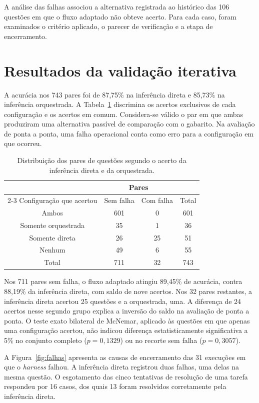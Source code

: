 \documentclass[a4paper,10pt, twocolumn]{article}
\begin{document}
A análise das falhas associou a alternativa registrada ao histórico das 106 questões em que o fluxo adaptado não obteve acerto. Para cada caso, foram examinados o critério aplicado, o parecer de verificação e a etapa de encerramento.

\clearpage
\section{Resultados da validação iterativa}

A acurácia nos 743 pares foi de 87,75\% na inferência direta e 85,73\% na inferência orquestrada. A Tabela~\ref{tab:pares} discrimina os acertos exclusivos de cada configuração e os acertos em comum. Considera-se válido o par em que ambas produziram uma alternativa passível de comparação com o gabarito. Na avaliação de ponta a ponta, uma falha operacional conta como erro para a configuração em que ocorreu.

\begin{table}[H]
\caption{Distribuição dos pares de questões segundo o acerto da inferência direta e da orquestrada.}\label{tab:pares}
\centering\small
\begin{tabular}{@{}cccc@{}}
\toprule
& \multicolumn{2}{c}{Pares} & \\
\cmidrule(lr){2-3}
Configuração que acertou & Sem falha & Com falha & Total \\
\midrule
Ambos & 601 & 0 & 601 \\
Somente orquestrada & 35 & 1 & 36 \\
Somente direta & 26 & 25 & 51 \\
Nenhum & 49 & 6 & 55 \\
\midrule
Total & 711 & 32 & 743 \\
\bottomrule
\end{tabular}
\end{table}

Nos 711 pares sem falha, o fluxo adaptado atingiu 89,45\% de acurácia, contra 88,19\% da inferência direta, com saldo de nove acertos. Nos 32 pares restantes, a inferência direta acertou 25 questões e a orquestrada, uma. A diferença de 24 acertos nesse segundo grupo explica a inversão do saldo na avaliação de ponta a ponta. O teste exato bilateral de McNemar, aplicado às questões em que apenas uma configuração acertou, não indicou diferença estatisticamente significativa a 5\% no conjunto completo ($p=0{,}1329$) ou no recorte sem falha ($p=0{,}3057$).

A Figura~\ref{fig:falhas} apresenta as causas de encerramento das 31 execuções em que o \textit{harness} falhou. A inferência direta registrou duas falhas, uma delas na mesma questão. O esgotamento das cinco tentativas de resolução de uma tarefa respondeu por 16 casos, dos quais 13 foram resolvidos corretamente pela inferência direta.
\end{document}
